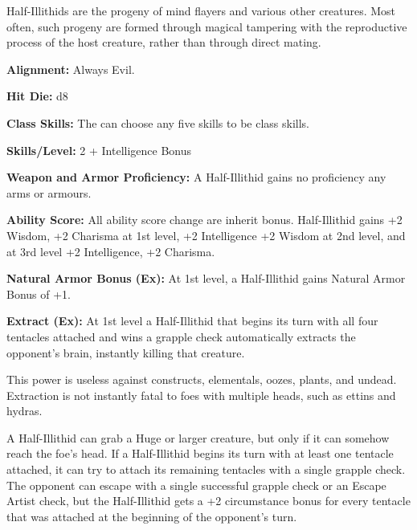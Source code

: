 
Half-Illithids are the progeny of mind flayers and various other creatures. Most often, such progeny are formed through magical tampering with the reproductive process of the host creature, rather than through direct mating.

\textbf{Alignment:} Always Evil.

\textbf{Hit Die:} d8

\textbf{Class Skills:} The \currentclassname{} can choose any five skills to be class skills.

\textbf{Skills/Level:} 2 + Intelligence Bonus

\modebab{}
\poorfor{}
\poorref{}
\goodwil{}

\begin{classtable}
\end{classtable}

\classfeatures

\textbf{Weapon and Armor Proficiency:} A Half-Illithid gains no proficiency any arms or armours.

\textbf{Ability Score:} All ability score change are inherit bonus. Half-Illithid gains +2 Wisdom, +2 Charisma at 1st level, +2 Intelligence +2 Wisdom at 2nd level, and at 3rd level +2 Intelligence, +2 Charisma.
 
\textbf{Natural Armor Bonus (Ex):} At 1st level, a Half-Illithid gains Natural Armor Bonus of +1.
 
 \textbf{Extract (Ex):} At 1st level a Half-Illithid that begins its turn with all four tentacles attached and wins a grapple check automatically extracts the opponent’s brain, instantly killing that creature.
 
This power is useless against constructs, elementals, oozes, plants, and undead. Extraction is not instantly fatal to foes with multiple heads, such as ettins and hydras.

A Half-Illithid can grab a Huge or larger creature, but only if it can somehow reach the foe’s head. If a Half-Illithid begins its turn with at least one tentacle attached, it can try to attach its remaining tentacles with a single grapple check. The opponent can escape with a single successful grapple check or an Escape Artist check, but the Half-Illithid gets a +2 circumstance bonus for every tentacle that was attached at the beginning of the opponent’s turn.

